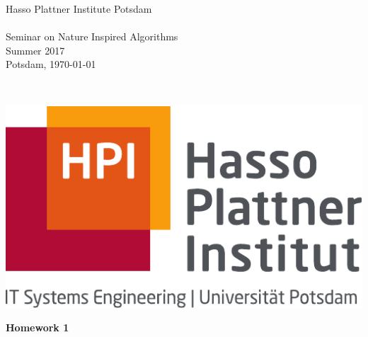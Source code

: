 \documentclass[12pt,a4paper]{article}
\begin{document}
\noindent
\begin{minipage}{0.66\textwidth}
Hasso Plattner Institute Potsdam\\
\\
Seminar on Nature Inspired Algorithms\\ Summer 2017\\
Potsdam, \today
\end{minipage}
~
\begin{minipage}{0.30\textwidth}
\includegraphics[width=\textwidth]{Hasso_Plattner_Institut_Logo}
\end{minipage}


\begin{center}
 {\LARGE \textbf{Homework 1}}
 \vspace*{0.5cm}
\end{center}



\section{}
\end{document}
